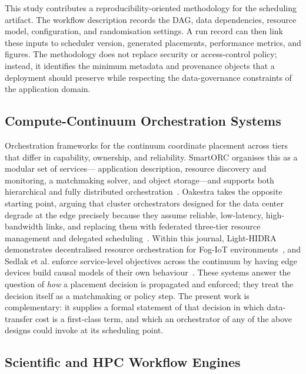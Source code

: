 This study contributes a reproducibility-oriented methodology for the scheduling artifact. The workflow description records the DAG, data dependencies, resource model, configuration, and randomisation settings. A run record can then link these inputs to scheduler version, generated placements, performance metrics, and figures. The methodology does not replace security or access-control policy; instead, it identifies the minimum metadata and provenance objects that a deployment should preserve while respecting the data-governance constraints of the application domain.

\subsection{Compute-Continuum Orchestration Systems}
\label{subsec:rw_orchestration}

Orchestration frameworks for the continuum coordinate placement across tiers that differ in
capability, ownership, and reliability. SmartORC organises this as a modular set of services---%
application description, resource discovery and monitoring, a matchmaking solver, and object
storage---and supports both hierarchical and fully distributed orchestration~\cite{carlini2023smartorc}.
Oakestra takes the opposite starting point, arguing that cluster orchestrators designed for the
data center degrade at the edge precisely because they assume reliable, low-latency,
high-bandwidth links, and replacing them with federated three-tier resource management and
delegated scheduling~\cite{bartolomeo2023oakestra}. Within this journal, Light-HIDRA demonstrates
decentralised resource orchestration for Fog-IoT environments~\cite{nunezgomez2024lighthidra}, and
Sedlak et al. enforce service-level objectives across the continuum by having edge devices build
causal models of their own behaviour~\cite{sedlak2024equilibrium}. These systems answer the
question of \emph{how} a placement decision is propagated and enforced; they treat the decision
itself as a matchmaking or policy step. The present work is complementary: it supplies a formal
statement of that decision in which data-transfer cost is a first-class term, and which an
orchestrator of any of the above designs could invoke at its scheduling point.

\subsection{Scientific and HPC Workflow Engines}
\label{subsec:rw_wms}

